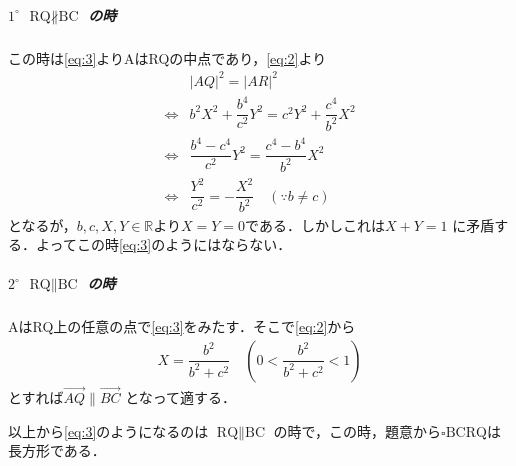 \documentclass[../../main.tex]{subfiles}
\begin{document}
\subparagraph{$1^\circ$ $\text{RQ} \not\parallel \text{BC}$ の時}

この時は\cref{eq:3}よりAはRQの中点であり，\cref{eq:2}より
\begin{align}
  & |AQ|^2 = |AR|^2 \\
  \iff
  & b^2 X^2 + \dfrac{b^4}{c^2} Y^2 = c^2 Y^2 + \dfrac{c^4}{b^2} X^2 \\
  \iff
  & \dfrac{b^4 - c^4}{c^2} Y^2 = \dfrac{c^4 - b^4}{b^2} X^2 \\
  \iff
  & \dfrac{Y^2}{c^2} = -\dfrac{X^2}{b^2} \quad (\because b \neq c)
\end{align}
となるが，$b, c, X, Y \in \mathbb{R}$より$X=Y=0$である．しかしこれは$X+Y=1$ に矛盾する．よってこの時\cref{eq:3}のようにはならない．

\subparagraph{$2^\circ$ $\text{RQ} \parallel \text{BC}$ の時}

AはRQ上の任意の点で\cref{eq:3}をみたす．そこで\cref{eq:2}から
\begin{align}
  X = \dfrac{b^2}{b^2+c^2} \quad (0 < \dfrac{b^2}{b^2+c^2} < 1)
\end{align}
とすれば$\overrightarrow{AQ} \parallel \overrightarrow{BC}$ となって適する．
\casesend

以上から\cref{eq:3}のようになるのは $\text{RQ} \parallel \text{BC}$ の時で，この時，題意から$\square \text{BCRQ}$は長方形である．
\end{document}
